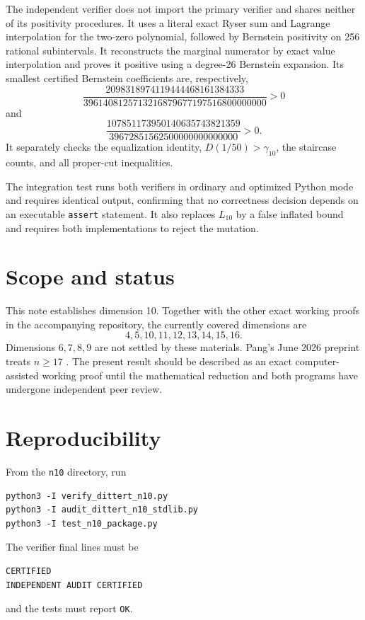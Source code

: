 \documentclass[11pt]{article}
\theoremstyle{remark}
\begin{document}
The independent verifier does not import the primary verifier and shares
neither of its positivity procedures.  It uses a literal exact Ryser sum and
Lagrange interpolation for the two-zero polynomial, followed by Bernstein
positivity on 256 rational subintervals.  It reconstructs the marginal
numerator by exact value interpolation and proves it positive using a
degree-26 Bernstein expansion.  Its smallest certified Bernstein
coefficients are, respectively,
\[
 \frac{2098318974119444468161384333}
 {3961408125713216879677197516800000000}>0
\]
and
\[
 \frac{107851173950140635743821359}
 {39672851562500000000000000}>0.
\]
It separately checks the equalization identity, $D(1/50)>\gamma_{10}$, the
staircase counts, and all proper-cut inequalities.

The integration test runs both verifiers in ordinary and optimized Python
mode and requires identical output, confirming that no correctness decision
depends on an executable \texttt{assert} statement.  It also replaces
$L_{10}$ by a false inflated bound and requires both implementations to
reject the mutation.

\section{Scope and status}

This note establishes dimension 10.  Together with the other exact working
proofs in the accompanying repository, the currently covered dimensions are
\[
 4,5,10,11,12,13,14,15,16.
\]
Dimensions $6,7,8,9$ are not settled by these materials.  Pang's June 2026
preprint treats $n\ge17$ \cite{Pang2026}.  The present result should be
described as an exact computer-assisted working proof until the mathematical
reduction and both programs have undergone independent peer review.

\section*{Reproducibility}

From the \texttt{n10} directory, run
\begin{verbatim}
python3 -I verify_dittert_n10.py
python3 -I audit_dittert_n10_stdlib.py
python3 -I test_n10_package.py
\end{verbatim}
The verifier final lines must be
\begin{verbatim}
CERTIFIED
INDEPENDENT AUDIT CERTIFIED
\end{verbatim}
and the tests must report \texttt{OK}.
\end{document}
